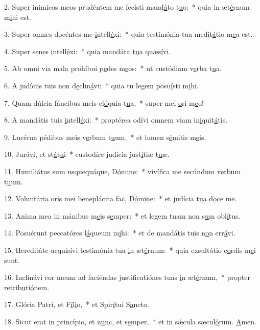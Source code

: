 2. Super inimícos meos prudéntem me fecísti mand\uline{á}to t\uline{u}o:~* quia in æt\uline{é}rnum m\uline{i}hi est.\par 
3. Super omnes docéntes me \uline{i}ntell\uline{é}xi:~* quia testimónia tua medit\uline{á}tio m\uline{e}a est.\par 
4. Super senes \uline{i}ntell\uline{é}xi:~* quia mandáta t\uline{u}a quæs\uline{í}vi.\par 
5. Ab omni via mala prohíbui p\uline{e}des m\uline{e}os:~* ut custódiam v\uline{e}rba t\uline{u}a.\par 
6. A judíciis tuis non d\uline{e}clin\uline{á}vi:~* quia tu legem posu\uline{í}sti m\uline{i}hi.\par 
7. Quam dúlcia fáucibus meis el\uline{ó}quia t\uline{u}a,~* super mel \uline{o}ri m\uline{e}o!\par 
8. A mandátis tuis \uline{i}ntell\uline{é}xi:~* proptérea odívi omnem viam in\uline{i}quit\uline{á}tis.\par 
9. Lucérna pédibus meis v\uline{e}rbum t\uline{u}um,~* et lumen s\uline{é}mitis m\uline{e}is.\par 
10. Jurávi, et st\uline{á}t\uline{u}i~* custodíre judícia just\uline{í}tiæ t\uline{u}æ.\par 
11. Humiliátus sum usquequáque, D\uline{ó}m\uline{i}ne:~* vivífica me secúndum v\uline{e}rbum t\uline{u}um.\par 
12. Voluntária oris mei beneplácita fac, D\uline{ó}m\uline{i}ne:~* et judícia t\uline{u}a d\uline{o}ce me.\par 
13. Anima mea in mánibus m\uline{e}is s\uline{e}mper:~* et legem tuam non s\uline{u}m obl\uline{í}tus.\par 
14. Posuérunt peccatóres l\uline{á}queum m\uline{i}hi:~* et de mandátis tuis n\uline{o}n err\uline{á}vi.\par 
15. Hereditáte acquisívi testimónia tua \uline{i}n æt\uline{é}rnum:~* quia exsultátio c\uline{o}rdis m\uline{e}i sunt.\par 
16. Inclinávi cor meum ad faciéndas justificatiónes tuas \uline{i}n æt\uline{é}rnum,~* propter retrib\uline{u}ti\uline{ó}nem.\par 
17. Glória Patri, et F\uline{í}l\uline{i}o,~* et Spir\uline{í}tui S\uline{a}ncto.\par 
18. Sicut erat in princípio, et n\uline{u}nc, et s\uline{e}mper,~* et in sǽcula sæcul\uline{ó}rum. \uline{A}men.\par 
